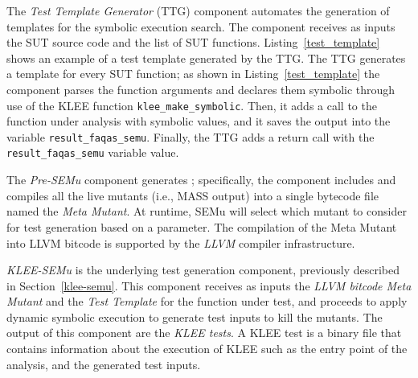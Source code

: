 
The \emph{Test Template Generator} (TTG) component automates the generation of templates for the symbolic execution search. The component receives as inputs the SUT source code and the list of SUT functions. 
Listing~\ref{test_template} shows an example of a test template generated by the TTG. The TTG generates a template for every SUT function; as shown in Listing~\ref{test_template} the component parses the function arguments and declares them symbolic through use of the KLEE function \texttt{klee\_make\_symbolic}. Then, it adds a call to the function under analysis with symbolic values, and it saves the output into the variable \texttt{result\_faqas\_semu}. Finally, the TTG adds a return call with the \texttt{result\_faqas\_semu} variable value.

The \emph{Pre-SEMu} component generates ; specifically, the component includes and compiles all the live mutants (i.e., MASS output) into a single bytecode file named the \emph{Meta Mutant}. At runtime, SEMu will select which mutant to consider for test generation based on a parameter. The compilation of the Meta Mutant into LLVM bitcode is supported by the \emph{LLVM} compiler infrastructure. 



\emph{KLEE-SEMu} is the underlying test generation component, previously described in Section~\ref{klee-semu}. This component receives as inputs the \emph{LLVM bitcode Meta Mutant} and the \emph{Test Template} for the function under test, and proceeds to apply dynamic symbolic execution to generate test inputs to kill the mutants. The output of this component are the \emph{KLEE tests}.
A KLEE test is a binary file that contains information about the execution of KLEE such as the entry point of the analysis, and the generated test inputs.

